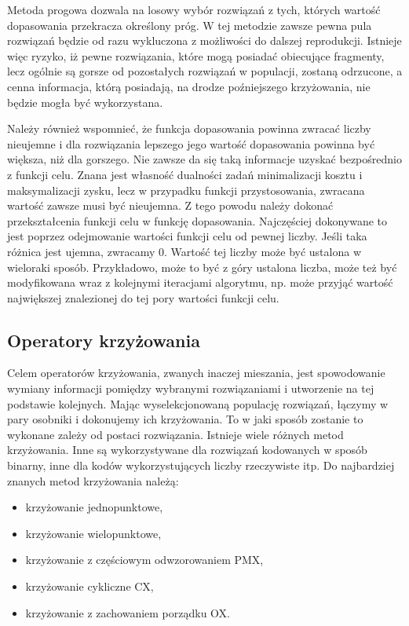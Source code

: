 Metoda progowa dozwala na losowy wybór rozwiązań z tych, których wartość dopasowania przekracza określony próg. W tej metodzie zawsze pewna pula rozwiązań będzie od razu wykluczona z możliwości do dalszej reprodukcji. Istnieje więc ryzyko, iż pewne rozwiązania, które mogą posiadać obiecujące fragmenty, lecz ogólnie są gorsze od pozostałych rozwiązań w populacji, zostaną odrzucone, a cenna informacja, którą posiadają, na drodze poźniejszego krzyżowania, nie będzie mogła być wykorzystana.

Należy również wspomnieć, że funkcja dopasowania powinna zwracać liczby nieujemne i dla rozwiązania lepszego jego wartość dopasowania powinna być większa, niż dla gorszego. Nie zawsze da się taką informacje uzyskać bezpośrednio z funkcji celu. Znana jest własność dualności zadań minimalizacji kosztu i maksymalizacji zysku, lecz w przypadku funkcji przystosowania, zwracana wartość zawsze musi być nieujemna. Z tego powodu należy dokonać przekształcenia funkcji celu w funkcję dopasowania. Najczęściej  dokonywane to jest poprzez odejmowanie wartości funkcji celu od pewnej liczby. Jeśli taka różnica jest ujemna, zwracamy 0. Wartość tej liczby może być ustalona w wieloraki sposób. Przykładowo, może to być z góry ustalona liczba, może też być modyfikowana wraz z kolejnymi iteracjami algorytmu, np. może przyjąć wartość największej znalezionej do tej pory wartości funkcji celu.

\subsection{Operatory krzyżowania}
Celem operatorów krzyżowania, zwanych inaczej mieszania, jest spowodowanie wymiany informacji pomiędzy wybranymi rozwiązaniami i utworzenie na tej podstawie kolejnych. Mając wyselekcjonowaną populację rozwiązań, łączymy w pary osobniki i dokonujemy ich krzyżowania. To w jaki sposób zostanie to wykonane zależy od postaci rozwiązania. Istnieje wiele różnych metod krzyżowania. Inne są wykorzystywane dla rozwiązań kodowanych w sposób binarny, inne dla kodów wykorzystujących liczby rzeczywiste itp. Do najbardziej znanych metod krzyżowania należą:
\begin{itemize}
\item krzyżowanie jednopunktowe,
\item krzyżowanie wielopunktowe,
\item krzyżowanie z częściowym odwzorowaniem PMX,
\item krzyżowanie cykliczne CX,
\item krzyżowanie z zachowaniem porządku OX.
\end{itemize}

